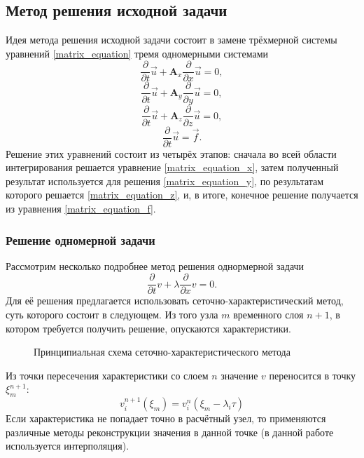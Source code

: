 \subsection{Метод решения исходной задачи}
Идея метода \cite{fedorenko} решения исходной задачи состоит в замене трёхмерной системы
уравнений \ref{matrix_equation} тремя одномерными системами 
\begin{equation}
\frac{\partial}{\partial t}\vec u+\mathbf{A}_x \frac{\partial}{\partial x}\vec u
= 0,
\label{matrix_equation_x}
\end{equation}
\begin{equation}
\frac{\partial}{\partial t}\vec u+\mathbf{A}_y \frac{\partial}{\partial y}\vec u
= 0,
\label{matrix_equation_y}
\end{equation}
\begin{equation}
\frac{\partial}{\partial t}\vec u+\mathbf{A}_z \frac{\partial}{\partial z}\vec u
= 0,
\label{matrix_equation_z}
\end{equation}
\begin{equation}
\frac{\partial}{\partial t}\vec u = \vec f.
\label{matrix_equation_f}
\end{equation}
Решение этих уравнений состоит из четырёх этапов: сначала во всей области
интегрирования решается уравнение \ref{matrix_equation_x}, затем полученный
результат используется для решения \ref{matrix_equation_y}, по результатам
которого решается \ref{matrix_equation_z}, и, в итоге, конечное решение
получается из уравнения \ref{matrix_equation_f}.
\subsubsection{Решение одномерной задачи}
Рассмотрим несколько подробнее метод решения однормерной задачи
\begin{equation}
\frac{\partial}{\partial t}v+\lambda \frac{\partial}{\partial x}v = 0.
\label{one_dim_eq}
\end{equation}
Для её решения предлагается использовать сеточно-характеристический метод, суть
которого состоит в следующем. Из того узла $m$ временного слоя $n+1$, в котором
требуется получить решение, опускаются характеристики.
\begin{figure}[h]
\caption{Принципиальная схема сеточно-характеристического метода}
\end{figure}
Из точки пересечения характеристики со слоем $n$ значение $v$ переносится в 
точку $\xi^{n+1}_m$:
$$v_i^{n+1}(\xi_m)=v^{n}_i(\xi_m-\lambda_i\tau)$$
Если характеристика не попадает точно в расчётный узел, то применяются различные
методы реконструкции значения в данной точке (в данной работе используется
интерполяция).
